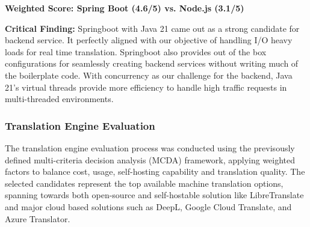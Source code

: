\begin{table}[h!]
\centering
\caption{Application Framework Comparison}
\end{table}

\textbf{Weighted Score: Spring Boot (4.6/5) vs. Node.js (3.1/5)}

\textbf{Critical Finding:} Springboot with Java 21 came out as a strong candidate for backend service. It perfectly aligned with our objective of handling I/O heavy loads for real time translation. Springboot also provides out of the box configurations for seamlessly creating backend services without writing much of the boilerplate code. With concurrency as our challenge for the backend, Java 21's virtual threads provide more efficiency to handle high traffic requests in multi-threaded environments.

\subsubsection{Translation Engine Evaluation}

The translation engine evaluation process was conducted using the previsously defined multi-criteria decision analysis (MCDA) framework, applying weighted factors to balance cost, usage, self-hosting capability and translation quality. The selected candidates represent the top available machine translation options, spanning towards both open-source and self-hostable solution like LibreTranslate and major cloud based solutions such as DeepL, Google Cloud Translate, and Azure Translator.

